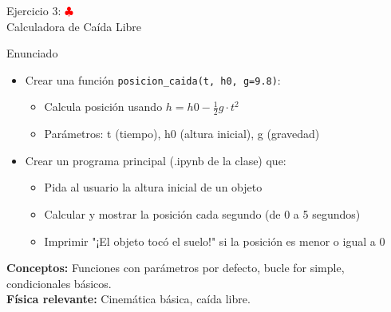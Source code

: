 \documentclass[10pt]{beamer}
\begin{document}
\begin{frame}{Ejercicio 3: \hfill \textcolor{red}{$\clubsuit$} \\ Calculadora de Caída Libre}
  \begin{block}{Enunciado}
    \begin{itemize}
      \item Crear una función \texttt{posicion\_caida(t, h0, g=9.8)}:
        \begin{itemize}
          \item Calcula posición usando $h = h0 - \frac{1}{2}g \cdot t^2$
          \item Parámetros: t (tiempo), h0 (altura inicial), g (gravedad)
        \end{itemize}
      \item Crear un programa principal (.ipynb de la clase) que:
        \begin{itemize}
          \item Pida al usuario la altura inicial de un objeto
          \item Calcular y mostrar la posición cada segundo (de 0 a 5 segundos)
          \item Imprimir "¡El objeto tocó el suelo!" si la posición es menor o igual a 0
        \end{itemize}
    \end{itemize}
  \end{block}
  
  \textbf{Conceptos:} Funciones con parámetros por defecto, bucle for simple, condicionales básicos.\\
  \textbf{Física relevante:} Cinemática básica, caída libre.
\end{frame}
\end{document}
